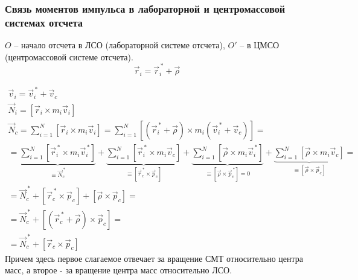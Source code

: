 \documentclass[a4paper,12pt]{extarticle}
\begin{document}
\subsubsection{Связь моментов импульса в лабораторной и центромассовой системах отсчета}
\newcommand\zi{^{\,*}_i}
\newcommand\sumn{\sum_{i=1}^{N}}
$O$ -- начало отсчета в ЛСО (лабораторной системе отсчета), $O'$ -- в ЦМСО (центромассовой системе отсчета).
\begin{equation}
	\vec{r}_i=\vec{r}\zi+\vec\rho
\end{equation}
\begin{figure}[htbp]
	\centering
\end{figure}
\begin{gather}
	\vec{v}_i=\vec{v}\zi+\vec{v}_c\\
	\vec{N}_i=[\vec{r}_i\times m_i\vec{v}_i]\\
	\vec{N}_c=\sumn[\vec{r}_i\times m_i\vec{v}_i]=\sumn[(\vec{r}\zi+\vec\rho)\times m_i(\vec{v}\zi+\vec{v}_c)]=\\=
	\underbrace{\sumn[\vec{r}\zi\times m_i\vec{v}\zi]}_{\displaystyle \equiv {\vec{N}_c^{\,*}}}+
	\underbrace{\sumn[\vec{r}\zi\times m_i\vec{v}_c]}_{\displaystyle \equiv [\vec{r}_c^{\,*}\times\vec{p}_c]}+
	\underbrace{\sumn[\vec\rho\times m_i\vec{v}\zi]}_{\displaystyle \equiv [\vec\rho\times\vec{p}_c^{\,*}]=0}+
	\underbrace{\sumn[\vec\rho\times m_i\vec{v}_c]}_{\displaystyle \equiv [\vec\rho\times\vec{p}_c]}=\\=
	{\vec{N}_c^{\,*}}+[\vec{r}_c^{\,*}\times\vec{p}_c]+[\vec\rho\times\vec{p}_c]=\\=
	{\vec{N}_c^{\,*}}+[(\vec{r}_c^{\,*}+\vec\rho)\times\vec{p}_c]=\\=
	\vec{N}_c^{\,*}+[\vec{r}_c\times\vec{p}_c]
\end{gather}
Причем здесь первое слагаемое отвечает за вращение СМТ относительно центра масс, а второе - за вращение центра масс относительно ЛСО.
\end{document}
